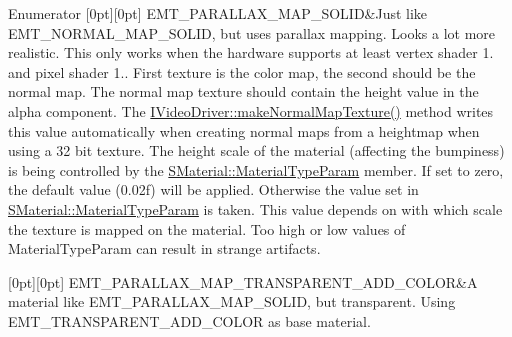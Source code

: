 \begin{DoxyEnumFields}{Enumerator}
[0pt][0pt]{}\mbox{\label{namespaceirr_1_1video_ac8e9b6c66f7cebabd1a6d30cbc5430f1a934021cc4ff72a7ac1a66f392b9abb82}} 
E\+M\+T\+\_\+\+P\+A\+R\+A\+L\+L\+A\+X\+\_\+\+M\+A\+P\+\_\+\+S\+O\+L\+ID&Just like E\+M\+T\+\_\+\+N\+O\+R\+M\+A\+L\+\_\+\+M\+A\+P\+\_\+\+S\+O\+L\+ID, but uses parallax mapping. Looks a lot more realistic. This only works when the hardware supports at least vertex shader 1. and pixel shader 1.. First texture is the color map, the second should be the normal map. The normal map texture should contain the height value in the alpha component. The \hyperlink{classirr_1_1video_1_1IVideoDriver_a6470e31c1aaf2c0fa5e5a5b3f8f092e0}{I\+Video\+Driver\+::make\+Normal\+Map\+Texture()} method writes this value automatically when creating normal maps from a heightmap when using a 32 bit texture. The height scale of the material (affecting the bumpiness) is being controlled by the \hyperlink{classirr_1_1video_1_1SMaterial_aefe0acce491efa8dedcd2b7cb49f8133}{S\+Material\+::\+Material\+Type\+Param} member. If set to zero, the default value (0.\+02f) will be applied. Otherwise the value set in \hyperlink{classirr_1_1video_1_1SMaterial_aefe0acce491efa8dedcd2b7cb49f8133}{S\+Material\+::\+Material\+Type\+Param} is taken. This value depends on with which scale the texture is mapped on the material. Too high or low values of Material\+Type\+Param can result in strange artifacts. \\
\hline

[0pt][0pt]{}\mbox{\label{namespaceirr_1_1video_ac8e9b6c66f7cebabd1a6d30cbc5430f1a8ac35c2f2af727ea1d9e14caaf3998f9}} 
E\+M\+T\+\_\+\+P\+A\+R\+A\+L\+L\+A\+X\+\_\+\+M\+A\+P\+\_\+\+T\+R\+A\+N\+S\+P\+A\+R\+E\+N\+T\+\_\+\+A\+D\+D\+\_\+\+C\+O\+L\+OR&A material like E\+M\+T\+\_\+\+P\+A\+R\+A\+L\+L\+A\+X\+\_\+\+M\+A\+P\+\_\+\+S\+O\+L\+ID, but transparent. Using E\+M\+T\+\_\+\+T\+R\+A\+N\+S\+P\+A\+R\+E\+N\+T\+\_\+\+A\+D\+D\+\_\+\+C\+O\+L\+OR as base material. \\
\hline


\end{DoxyEnumFields}
